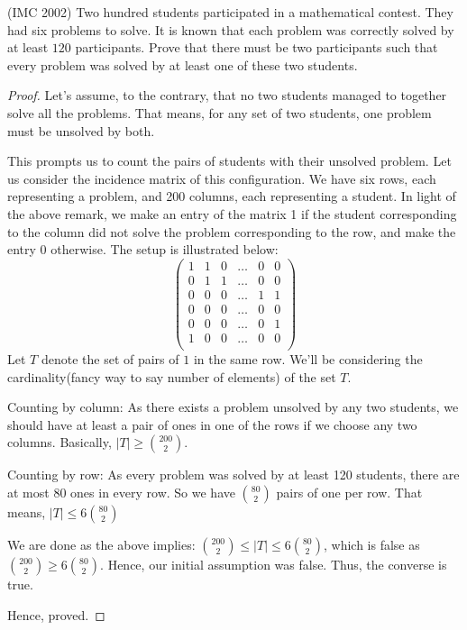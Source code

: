 \begin{example}
    (IMC 2002) Two hundred students participated in a mathematical contest. They had six problems to solve. It is known that each problem was correctly solved by at least $120$ participants. Prove that there must be two participants such that every problem was solved by at least one of these two students.
\end{example}
\begin{proof}
    Let's assume, to the contrary, that no two students managed to together solve all the problems. That means, for any set of two students, one problem must be unsolved by both.\par
    This prompts us to count the pairs of students with their unsolved problem. Let us consider the incidence matrix of this configuration. We have six rows, each representing a problem, and 200 columns, each representing a student. In light of the above remark, we make an entry of the matrix 1 if the student corresponding to the column did not solve the problem corresponding to the row, and make the entry 0 otherwise. The setup is illustrated below:
    \[ \begin{pmatrix}
1 & 1 & 0 & \dots & 0 & 0 \\
0 & 1 & 1 & \dots & 0 & 0 \\
0 & 0 & 0 & \dots & 1 & 1 \\
0 & 0 & 0 & \dots & 0 & 0 \\
0 & 0 & 0 & \dots & 0 & 1 \\
1 & 0 & 0 & \dots & 0 & 0 \\
\end{pmatrix}\]
Let $T$ denote the set of pairs of $1$ in the same row. We'll be considering the cardinality(fancy way to say number of elements) of the set $T$.\par
Counting by column: As there exists a problem unsolved by any two students, we should have at least a pair of ones in one of the rows if we choose any two columns. Basically, $|T| \geq \binom{200}{2}$.\par
Counting by row: As every problem was solved by at least 120 students, there are at most 80 ones in every row.  So we have $\binom{80}{2}$ pairs of one per row. That means, $|T| \leq 6 \binom{80}{2}$\par
We are done as the above implies: $\binom{200}{2} \leq |T| \leq 6 \binom{80}{2}$, which is false as $\binom{200}{2}  \geq 6 \binom{80}{2}$. Hence, our initial assumption was false. Thus, the converse is true. \par
Hence, proved.\par
\end{proof}
